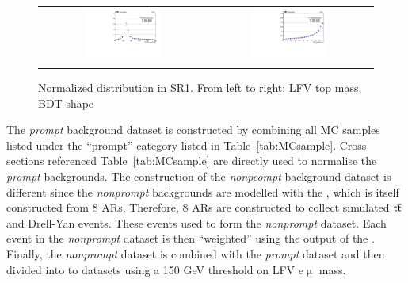 \begin{figure}[tbh!]
 \begin{center}
 \begin{tabular}{cc}
  \includegraphics[width=0.48\textwidth]{figures/Part3/BDT/LFV_VR_emul_lllOffZMetg20Jetgeq1Bleq1_LFVTopmass_N}&
    \includegraphics[width=0.48\textwidth]{figures/Part3/BDT/LFV_VR_emul_lllOffZMetg20Jetgeq1Bleq1_BDT_TT_N}\\
 \end{tabular}
 \caption{Normalized distribution in SR1. From left to right: LFV top mass, BDT shape}
 \label{fig:Lorentz}
 \end{center}
\end{figure}

The \emph{prompt} background dataset is constructed by combining all \ac{MC} samples listed under the ``prompt'' category listed in Table~\ref{tab:MCsample}. Cross sections referenced Table~\ref{tab:MCsample} are directly used to normalise the \emph{prompt} backgrounds. The construction of the \emph{nonpeompt} background dataset is different since the \emph{nonprompt} backgrounds are modelled with the \mm, which is itself constructed from 8 \acp{AR}. Therefore, 8 \acp{AR} are constructed to collect simulated $\ttbar$ and Drell-Yan events. These events used to form the \emph{nonprompt} dataset. Each event in the \emph{nonprompt} dataset is then ``weighted'' using the output of the \mm. Finally, the \emph{nonprompt} dataset is combined with the \emph{prompt} dataset and then divided into to datasets using a 150 GeV threshold on LFV e$\upmu$ mass. 

